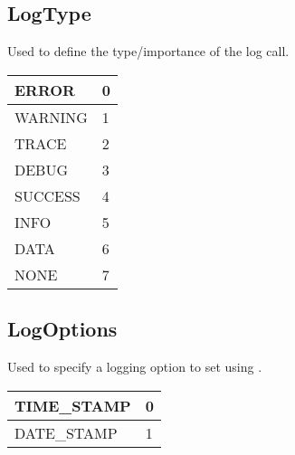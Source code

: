 \documentclass[letterpaper,10pt,english]{sphinxmanual}
\begin{document}
\subsection{LogType}
\label{\detokenize{log:logtype}}

\begin{fulllineitems}
\label{\detokenize{log:_CPPv2N6pessum7LogTypeE}}%
\pysigstartmultiline
{}%
\pysigstopmultiline
Used to define the type/importance of the log call.


\begin{savenotes}\sphinxattablestart
\centering
\begin{tabulary}{\linewidth}[t]{|T|T|}
\hline

ERROR
&
0
\\
\hline
WARNING
&
1
\\
\hline
TRACE
&
2
\\
\hline
DEBUG
&
3
\\
\hline
SUCCESS
&
4
\\
\hline
INFO
&
5
\\
\hline
DATA
&
6
\\
\hline
NONE
&
7
\\
\hline
\end{tabulary}
\par
\sphinxattableend\end{savenotes}

\end{fulllineitems}



\subsection{LogOptions}
\label{\detokenize{log:logoptions}}

\begin{fulllineitems}
\label{\detokenize{log:_CPPv2N6pessum10LogOptionsE}}%
\pysigstartmultiline
{}%
\pysigstopmultiline
Used to specify a logging option to set using {\hyperref[\detokenize{log:_CPPv2N6pessum12SetLogOptionEii}]{}}.


\begin{savenotes}\sphinxattablestart
\centering
\begin{tabulary}{\linewidth}[t]{|T|T|}
\hline

TIME\_STAMP
&
0
\\
\hline
DATE\_STAMP
&
1
\\
\hline
\end{tabulary}
\par
\sphinxattableend\end{savenotes}

\end{fulllineitems}
\end{document}
